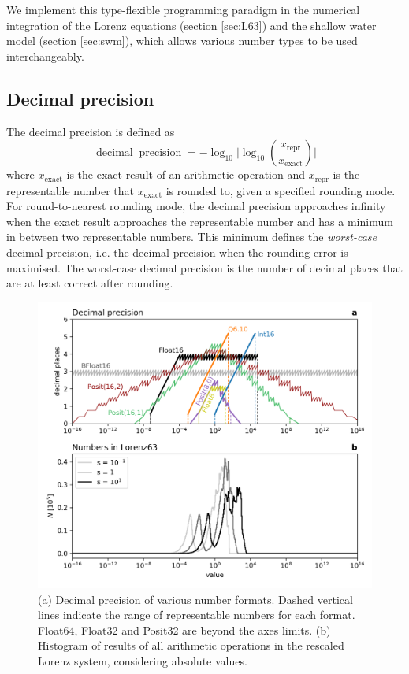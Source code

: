 \documentclass[draft]{agujournal2019}
\newcommand{\op}{\operatorname}
\begin{document}
We implement this type-flexible programming paradigm in the numerical integration of the Lorenz equations (section \ref{sec:L63}) and the shallow water model (section \ref{sec:swm}), which allows various number types to be used interchangeably.

\subsection{Decimal precision}
\label{sec:decprec}

The decimal precision is defined as \cite{Gustafson2017,Gustafson2017b}
\begin{equation}
\op{decimal} \op{precision} = -\log_{10} \vert \log_{10}( \frac{x_\text{repr}}{x_\text{exact}} ) \vert
\end{equation}
where $x_\text{exact}$ is the exact result of an arithmetic operation and $x_\text{repr}$ is the representable number that $x_\text{exact}$ is rounded to, given a specified rounding mode. For round-to-nearest rounding mode, the decimal precision approaches infinity when the exact result approaches the representable number and has a minimum in between two representable numbers. This minimum defines the \emph{worst-case} decimal precision, i.e. the decimal precision when the rounding error is maximised. The worst-case decimal precision is the number of decimal places that are at least correct after rounding. 

\begin{figure}[htbp]
\includegraphics[width=1\textwidth]{../plots/decimal_precision.png}
\caption{(a) Decimal precision of various number formats. Dashed vertical lines indicate the range of representable numbers for each format. Float64, Float32 and Posit32 are beyond the axes limits. (b) Histogram of results of all arithmetic operations in the rescaled Lorenz system, considering absolute values.}
\label{fig:dec_acc}
\end{figure}
\end{document}
